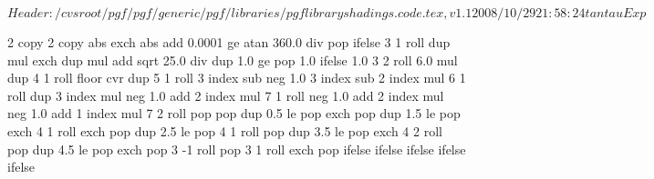 %
%
%

\ProvidesFileRCS[v\pgfversion] $Header: /cvsroot/pgf/pgf/generic/pgf/libraries/pgflibraryshadings.code.tex,v 1.1 2008/10/29 21:58:24 tantau Exp $


%
%

{\pgfpoint{-50bp}{-50bp}}
{\pgfpoint{50bp}{50bp}}
{}
{ %
  2 copy %
  2 copy abs exch abs add 0.0001 ge 
  {atan 360.0 div} %
  { pop } %
  ifelse  %
  3 1 roll %
  dup mul %
  exch dup mul %
  add sqrt %
  25.0 div %
  dup 1.0 ge %
  { pop 1.0 }{} ifelse %
  1.0 %
  3 2 roll 6.0 mul dup 4 1 roll %
  floor cvr  %
  dup 5 1 roll %
  3 index sub neg %
  1.0 3 index sub %
  2 index mul %
  6 1 roll %
  dup 3 index mul neg 1.0 add %
  2 index mul %
  7 1 roll %
  neg 1.0 add %
  2 index mul neg 1.0  add %
  1 index mul %
  7 2 roll %
  pop pop %
  dup 0.5 le %
  { %
    pop exch pop
  }
  { dup 1.5 le %
    { %
      pop exch 4 1 roll exch pop
    }
    { dup 2.5 le %
      { %
        pop 4 1 roll pop
      }
      { dup 3.5 le %
        { %
          pop exch 4 2 roll pop
        }
        { dup 4.5 le %
          { %
            pop exch pop 3 -1 roll
          }
          { %
            pop 3 1 roll exch pop
          }
          ifelse
        }
        ifelse %
      }
      ifelse %
    }
    ifelse %
  }
  ifelse %
}

